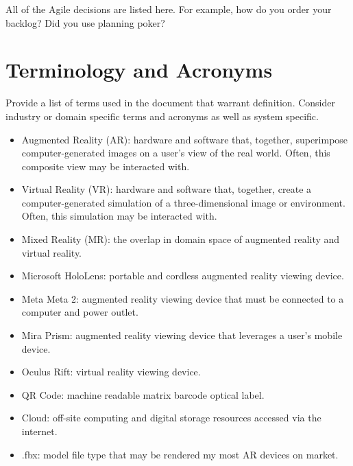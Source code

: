 All of the Agile decisions are listed here.  For example, how do you order your backlog?   
Did you use planning poker?   

\section{Terminology and Acronyms}
Provide a list of terms used in the document that warrant definition.  Consider 
industry or domain specific terms and acronyms as well as system specific. 

\begin{itemize}
	\item Augmented Reality (AR): hardware and software that, together, superimpose computer-generated images on a user's view of the real world. Often, this composite view may be interacted with. 

\item Virtual Reality (VR): hardware and software that, together, create a computer-generated simulation of a three-dimensional image or environment. Often, this simulation may be interacted with. 

\item Mixed Reality (MR): the overlap in domain space of augmented reality and virtual reality. 

\item Microsoft HoloLens: portable and cordless augmented reality viewing device. 

\item Meta Meta 2: augmented reality viewing device that must be connected to a computer and power outlet. 

\item Mira Prism: augmented reality viewing device that leverages a user's mobile device.

\item Oculus Rift: virtual reality viewing device. 

\item QR Code: machine readable matrix barcode optical label.

\item Cloud: off-site computing and digital storage resources accessed via the internet. 

\item .fbx: model file type that may be rendered my most AR devices on market.

\end{itemize}





